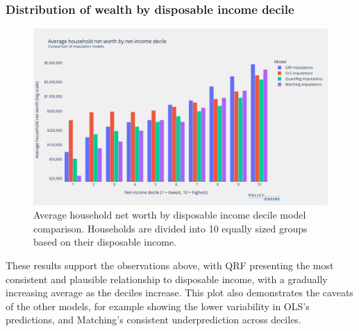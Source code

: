 \subsubsection{Distribution of wealth by disposable income decile}

\begin{figure}[h]
    \centering
    \includegraphics[width=\textwidth]{figures/imputation_comparison_by_income_decile.png}
    \caption{Average household net worth by disposable income decile model comparison. Households are divided into 10 equally sized groups based on their disposable income.}
    \label{fig:imputation_comparison_by_income_decile}
\end{figure}

These results support the observations above, with QRF presenting the most consistent and plausible relationship to disposable income, with a gradually increasing average as the deciles increase. This plot also demonstrates the caveats of the other models, for example showing the lower variability in OLS's predictions, and Matching's consistent underprediction across deciles.
